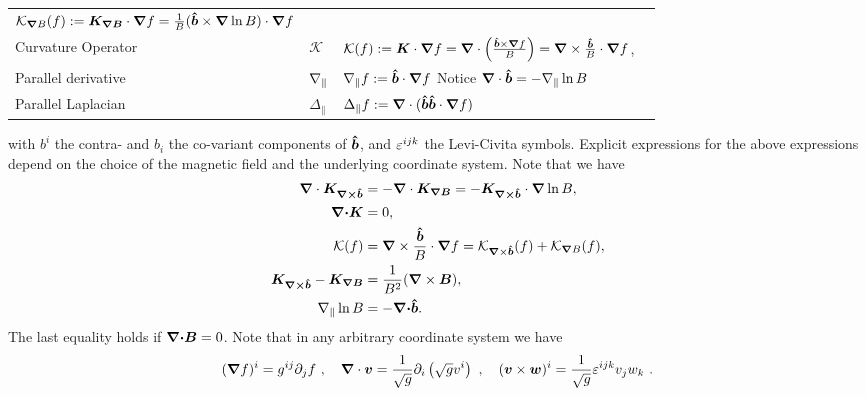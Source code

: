 \begin{table*}[htbp]
\begin{longtable}{lll>{\RaggedRight}p{7cm}}
    $\mathcal K_{{\boldsymbol{\nabla}} B}(f) := {\boldsymbol{ K_{{\boldsymbol{\nabla}} B}}} \cdot{\boldsymbol{\nabla}} f = \frac{1}{B}(\bm{\hat{b}} \times{\boldsymbol{\nabla}} \ln B)\cdot{\boldsymbol{\nabla}} f$ \\[4pt]
    Curvature Operator&
    $\mathcal K$ &
    $\mathcal{K}(f):={\boldsymbol{ K}} \cdot{\boldsymbol{\nabla}} f =
     {\boldsymbol{{\boldsymbol{\nabla}}}}\cdot\left(\frac{\bm{\hat{b}}\times{\boldsymbol{{\boldsymbol{\nabla}}}} f}{B}\right) ={\boldsymbol{\nabla}} \times \frac{\bm{\hat{b}}}{B} \cdot{\boldsymbol{\nabla}} f$,\\[4pt]
    Parallel derivative&
    $\nabla_\parallel $&
    $ \nabla_\parallel f := \bm{\hat{b}}\cdot{\boldsymbol{\nabla}} f$ \quad  Notice ${\boldsymbol{\nabla}}\cdot\bm{\hat{b}} = -\nabla_\parallel\ln B$ \\
     Parallel Laplacian&
     $\Delta_\parallel $&
     $\Delta_\parallel f:= {\boldsymbol{{\boldsymbol{\nabla}}}} \cdot ( \bm{\hat{b}}\bm{\hat{b}}\cdot{\boldsymbol{{\boldsymbol{\nabla}}}} f )$\\
\bottomrule
\end{longtable}
\end{table*}
with $b^i$ the contra- and $b_i$ the co-variant components of $\bm{\hat{b}}$, and
$\varepsilon^{ijk}$ the Levi-Civita symbols.
Explicit expressions for the above expressions
depend on the choice of the magnetic field and the underlying coordinate system.
Note that we have
\begin{align}
    \nc \vec{ K_{\vn\times\bhat}}
&= -\nc \vec{ K_{\vn B}} = -\vec{K_{\vn\times\bhat}}\cn\ln B, \\
    \vec\nc\vec{ K} &= 0, \\
    \mathcal K(f) &=
     \vn\times\frac{\bhat}{B}\cn f
    = \mathcal K_{\vn\times\bhat}(f) + \mathcal K_{\vn B}(f),\\
    \vec{ K_{\vn\times\bhat}} - \vec{ K_{\vn B}} &= \frac{1}{B^2} (\vn \times \vec B), \\
    \npar \ln B &= -\vec\nc\bhat.
    \label{eq:curl_curvature}
\end{align}
The last equality holds if ${\boldsymbol{{\boldsymbol{\nabla}}\cdot}} {\boldsymbol{B}} = 0$.
Note that in any arbitrary coordinate system we have
\begin{align}
({\boldsymbol{\nabla}} f)^i = g^{ij}\partial_j f ~, \quad
{\boldsymbol{\nabla}}\cdot {\boldsymbol{v}} = \frac{1}{\sqrt{g}}\partial_i \left(\sqrt{g} v^i\right) ~, \quad
({\boldsymbol{v}} \times {\boldsymbol{w}})^i = \frac{1}{\sqrt{g}}\varepsilon^{ijk} v_jw_k ~.
\end{align}

